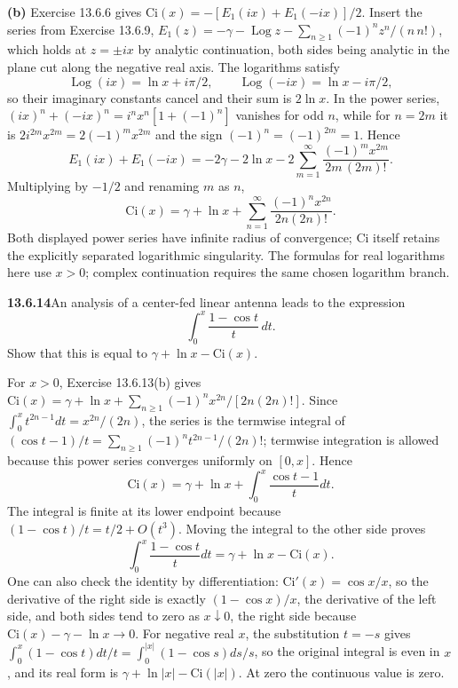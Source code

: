 \textbf{(b)} Exercise 13.6.6 gives
$\mathrm{Ci}(x)=-[E_1(ix)+E_1(-ix)]/2$.
Insert the series from Exercise 13.6.9,
$E_1(z)=-\gamma-\operatorname{Log}z-\sum_{n\ge1}(-1)^nz^n/(n\,n!)$,
which holds at $z=\pm ix$ by analytic continuation, both sides
being analytic in the plane cut along the negative real axis.
The logarithms satisfy
\[
\operatorname{Log}(ix)=\ln x+i\pi/2,\qquad
\operatorname{Log}(-ix)=\ln x-i\pi/2,
\]
so their imaginary constants cancel and their sum is $2\ln x$.
In the power series,
$(ix)^n+(-ix)^n=i^nx^n[1+(-1)^n]$ vanishes for odd $n$, while for
$n=2m$ it is $2i^{2m}x^{2m}=2(-1)^mx^{2m}$ and the sign
$(-1)^n=(-1)^{2m}=1$.  Hence
\[
E_1(ix)+E_1(-ix)=-2\gamma-2\ln x
-2\sum_{m=1}^{\infty}\frac{(-1)^mx^{2m}}{2m\,(2m)!}.
\]
Multiplying by $-1/2$ and renaming $m$ as $n$,
\[
\boxed{\mathrm{Ci}(x)=\gamma+\ln x+
\sum_{n=1}^{\infty}\frac{(-1)^nx^{2n}}{2n(2n)!}}.
\]
Both displayed power series have infinite radius of convergence;
$\mathrm{Ci}$ itself retains the explicitly separated logarithmic
singularity.  The formulas for real logarithms here use $x>0$;
complex continuation requires the same chosen logarithm branch.


\par\bigskip
\noindent\textbf{13.6.14}\quad An analysis of a center-fed linear antenna
leads to the expression
\[
\int_{0}^{x}\frac{1-\cos t}{t}\,dt.
\]
Show that this is equal to $\gamma+\ln x-\mathrm{Ci}(x)$.
\par\smallskip
{}
\solution
For $x>0$, Exercise 13.6.13(b) gives
$\mathrm{Ci}(x)=\gamma+\ln x+\sum_{n\ge1}(-1)^nx^{2n}/[2n(2n)!]$.
Since $\int_0^xt^{2n-1}dt=x^{2n}/(2n)$, the series is the termwise
integral of $(\cos t-1)/t=\sum_{n\ge1}(-1)^nt^{2n-1}/(2n)!$;
termwise integration is allowed because this power series
converges uniformly on $[0,x]$.  Hence
\[
\mathrm{Ci}(x)=\gamma+\ln x+
\int_0^x\frac{\cos t-1}{t}dt.
\]
The integral is finite at its lower endpoint because
$(1-\cos t)/t=t/2+O(t^3)$.  Moving the integral to the other
side proves
\[
\boxed{\int_0^x\frac{1-\cos t}{t}dt
=\gamma+\ln x-\mathrm{Ci}(x)}.
\]
One can also check the identity by differentiation:
$\mathrm{Ci}'(x)=\cos x/x$, so the derivative of the right
side is exactly $(1-\cos x)/x$, the derivative of the left side,
and both sides tend to zero as $x\downarrow0$, the right side
because $\mathrm{Ci}(x)-\gamma-\ln x\to0$.  For negative
real $x$, the substitution $t=-s$ gives
$\int_0^{x}(1-\cos t)dt/t=\int_0^{|x|}(1-\cos s)ds/s$, so the
original integral is even in $x$, and its real
form is $\gamma+\ln|x|-\mathrm{Ci}(|x|)$.  At zero the
continuous value is zero.



